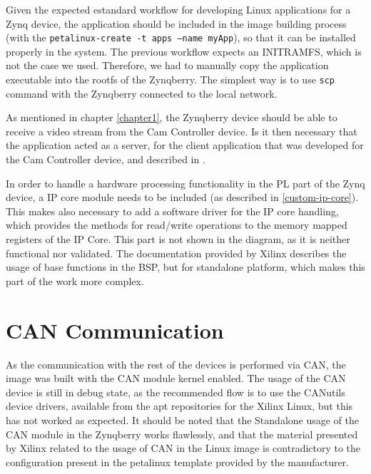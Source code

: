 Given the expected estandard workflow for developing Linux applications for a Zynq device, the
application should be included in the image building process (with the
\texttt{petalinux-create -t apps --name myApp}), so that it can be installed properly in the system.
The previous workflow expects an INITRAMFS, which is not the case we used. Therefore, we had to
manually copy the application executable into the rootfs of the Zynqberry. The simplest way is to
use \texttt{scp} command with the Zynqberry connected to the local network.

As mentioned in chapter \ref{chapter1}, the Zynqberry device should be able to receive a video
stream from the Cam Controller device. Is it then necessary that the application acted as a server,
for the client application that was developed for the Cam Controller device, and described in
\cite{Poliakov2018}.

In order to handle a hardware processing functionality in the PL part of the Zynq device, a IP core
module needs to be included (as described in \ref{custom-ip-core}). This makes also necessary to add
a software driver for the IP core handling, which provides the methods for read/write operations to
the memory mapped registers of the IP Core. This part is not shown in the diagram, as it is neither
functional nor validated. The documentation provided by Xilinx describes the usage of base functions
in the BSP, but for standalone platform, which makes this part of the work more complex.

\section{CAN Communication}

As the communication with the rest of the devices is performed via CAN, the image was built with the
CAN module kernel enabled. The usage of the CAN device is still in debug state, as the recommended
flow is to use the CANutils device drivers, available from the apt repositories for the Xilinx
Linux, but this has not worked as expected. It should be noted that the Standalone usage of the CAN
module in the Zynqberry works flawlessly, and that the material presented by Xilinx related to
the usage of CAN in the Linux image is contradictory to the configuration present in the petalinux
template provided by the manufacturer.
